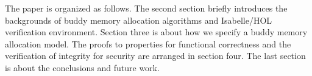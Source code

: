 The paper is organized as follows. The second section briefly introduces the backgrounds of buddy memory allocation algorithms and Isabelle/HOL verification environment. Section three is about how we specify a buddy memory allocation model. The proofs to properties for functional correctness and the verification of integrity for security are arranged in section four. The last section is about the conclusions and future work.
